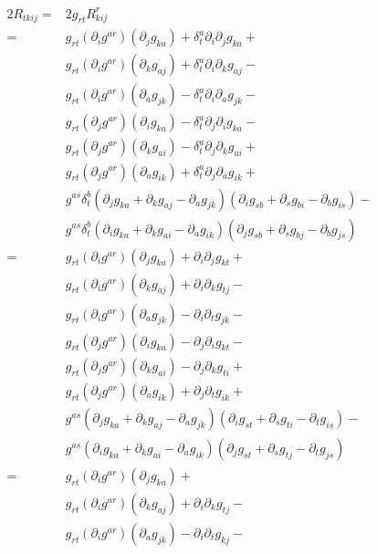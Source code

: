 \begin{equation}\label{RicciC_eq2}
\begin{aligned}
2R_{tkij}=&2g_{rt}R^r_{kij}\\
=&g_{rt}(\partial_ig^{ar})(\partial_jg_{ka})+\delta^a_t\partial_i\partial_jg_{ka}+\\
&g_{rt}(\partial_ig^{ar})(\partial_kg_{aj})+\delta^a_t\partial_i\partial_kg_{aj}-\\
&g_{rt}(\partial_ig^{ar})(\partial_ag_{jk})-\delta^a_t\partial_i\partial_ag_{jk}-\\%
&g_{rt}(\partial_jg^{ar})(\partial_ig_{ka})-\delta^a_t\partial_j\partial_ig_{ka}-\\
&g_{rt}(\partial_jg^{ar})(\partial_kg_{ai})-\delta^a_t\partial_j\partial_kg_{ai}+\\
&g_{rt}(\partial_jg^{ar})(\partial_ag_{ik})+\delta^a_t\partial_j\partial_ag_{ik}+\\%
&g^{as}\delta^b_t(\partial_jg_{ka}+\partial_kg_{aj}-\partial_ag_{jk})(\partial_ig_{sb}+\partial_sg_{bi}-\partial_bg_{is})-\\
&g^{as}\delta^b_t(\partial_ig_{ka}+\partial_kg_{ai}-\partial_ag_{ik})(\partial_jg_{sb}+\partial_sg_{bj}-\partial_bg_{js})\\
=&g_{rt}(\partial_ig^{ar})(\partial_jg_{ka})+\partial_i\partial_jg_{kt}+\\
&g_{rt}(\partial_ig^{ar})(\partial_kg_{aj})+\partial_i\partial_kg_{tj}-\\
&g_{rt}(\partial_ig^{ar})(\partial_ag_{jk})-\partial_i\partial_tg_{jk}-\\%
&g_{rt}(\partial_jg^{ar})(\partial_ig_{ka})-\partial_j\partial_ig_{kt}-\\
&g_{rt}(\partial_jg^{ar})(\partial_kg_{ai})-\partial_j\partial_kg_{ti}+\\
&g_{rt}(\partial_jg^{ar})(\partial_ag_{ik})+\partial_j\partial_tg_{ik}+\\%
&g^{as}(\partial_jg_{ka}+\partial_kg_{aj}-\partial_ag_{jk})(\partial_ig_{st}+\partial_sg_{ti}-\partial_tg_{is})-\\
&g^{as}(\partial_ig_{ka}+\partial_kg_{ai}-\partial_ag_{ik})(\partial_jg_{st}+\partial_sg_{tj}-\partial_tg_{js})\\
=&g_{rt}(\partial_ig^{ar})(\partial_jg_{ka})+\\
&g_{rt}(\partial_ig^{ar})(\partial_kg_{aj})+\partial_i\partial_kg_{tj}-\\
&g_{rt}(\partial_ig^{ar})(\partial_ag_{jk})-\partial_i\partial_tg_{kj}-\\%

\end{aligned}
\end{equation}
